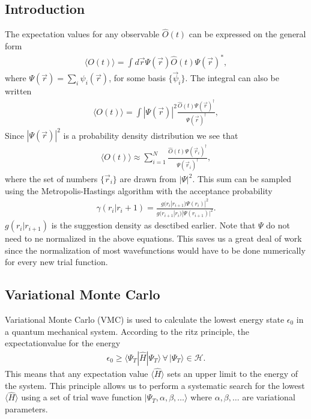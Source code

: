 \documentclass[a4paper,10pt,twocolumn]{article} %
\newcommand{\bra}[1]{\langle{#1}|}
\newcommand{\ket}[1]{|#1\rangle{}}
\newcommand{\expec}[1]{\langle{}{#1}\rangle{}}
\begin{document}
\subsection{Introduction}%

The expectation values for any observable $\hat O(t)$ can be expressed on the general form
\begin{align}
	\expec{ O(t) } = \int d\vec r \Psi(\vec r) \hat O(t) \Psi(\vec r)^*,\label{exv}
\end{align}
where $\Psi(\vec r) = \sum_i \psi_i(\vec r)$, for some basis $\{ \vec \psi_i \}$. 
The integral can also be written 
\begin{align}
	\expec{ O(t) } = \int |\Psi(\vec r)|^2 \frac{ \hat O(t) \Psi(\vec r)^\dagger } {\Psi(\vec r)^\dagger},
\end{align}
Since $|\Psi(\vec r)|^2$ is a probability density distribution we see that
\begin{align}
	\expec{ O(t) } \approx \sum_{i=1}^N \frac{ \hat O(t) \Psi(\vec r_i)^\dagger } {\Psi(\vec r_i)^\dagger}, \label{RFQMC1} 
\end{align}
%
where the set of numbers $\{\vec r_i\}$ are drawn from $|\Psi|^2$.
This sum can be sampled using the Metropolis-Hastings algorithm with the acceptance probability 
\begin{align}
	\gamma(r_i|r_i+1)=\frac
		{g(r_i|r_{i+1})\Psi(r_i)|^2}
		{g(r_{i+1}|r_i)|\Psi(r_{i+1})|^2}.
\end{align} 
$g(r_i|r_{i+1})$ is the suggestion density as desctibed earlier.
%
Note that $\Psi$ do not need to ne normalized in the above equations. This saves us a great deal of work since the normalization 
of most wavefunctions would have to be done numerically for every new trial function.%


\subsection{Variational Monte Carlo}%

Variational Monte Carlo (VMC) is used to calculate the lowest energy state $\epsilon_0$ in a quantum mechanical system.
According to the ritz principle, the expectationvalue for the energy 
\begin{align}
	\epsilon_0\ge\bra{\Psi_T} \hat H \ket{\Psi_T}\,\forall\,\ket{\Psi_T}\in\mathcal H.
\end{align} 
%
This means that any expectation value $\expec{\hat H}$ sets an upper limit to the energy of the system. 
%
This principle allows us to perform a systematic search for the lowest $\expec{\hat H}$ using a set of trial wave function 
$\ket{\Psi_T,\alpha,\beta,\dots}$ where $\alpha,\beta,\dots$ are variational parameters. %
\end{document}
